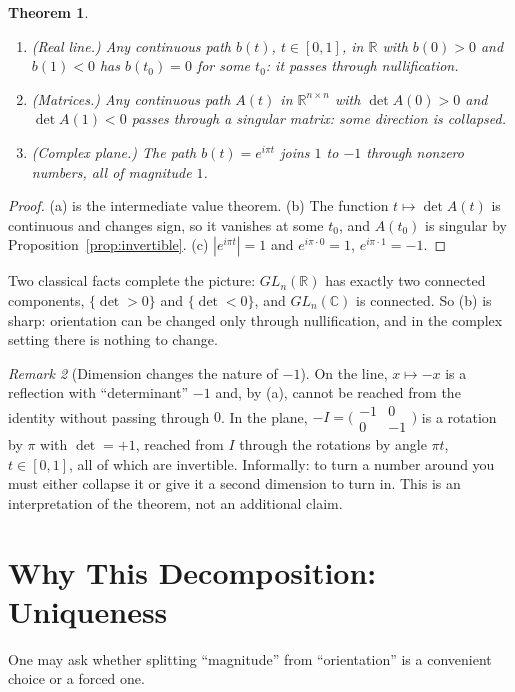 \documentclass[12pt]{article}
\newtheorem{theorem}{Theorem}
\theoremstyle{definition}
\theoremstyle{remark}
\newtheorem{remark}[theorem]{Remark}
\newcommand{\R}{\mathbb{R}}
\newcommand{\C}{\mathbb{C}}
\begin{document}
\begin{theorem}\label{thm:orientation}
\begin{enumerate}
\item[\textup{(a)}] \emph{(Real line.)} Any continuous path $b(t)$, $t\in[0,1]$, in $\R$ with $b(0)>0$ and $b(1)<0$ has $b(t_0)=0$ for some $t_0$: it passes through nullification.
\item[\textup{(b)}] \emph{(Matrices.)} Any continuous path $A(t)$ in $\R^{n\times n}$ with $\det A(0)>0$ and $\det A(1)<0$ passes through a singular matrix: some direction is collapsed.
\item[\textup{(c)}] \emph{(Complex plane.)} The path $b(t)=e^{i\pi t}$ joins $1$ to $-1$ through nonzero numbers, all of magnitude $1$.
\end{enumerate}
\end{theorem}
\begin{proof}
(a) is the intermediate value theorem. (b) The function $t\mapsto\det A(t)$ is continuous and changes sign, so it vanishes at some $t_0$, and $A(t_0)$ is singular by Proposition~\ref{prop:invertible}. (c) $|e^{i\pi t}|=1$ and $e^{i\pi\cdot0}=1$, $e^{i\pi\cdot1}=-1$.
\end{proof}

\noindent Two classical facts \cite{hall2015} complete the picture: $GL_n(\R)$ has exactly two connected components, $\{\det>0\}$ and $\{\det<0\}$, and $GL_n(\C)$ is connected. So (b) is sharp: orientation can be changed only through nullification, and in the complex setting there is nothing to change.

\begin{remark}[Dimension changes the nature of $-1$]\label{rem:dimension}
On the line, $x\mapsto -x$ is a reflection with ``determinant'' $-1$ and, by (a), cannot be reached from the identity without passing through $0$. In the plane, $-I=\bigl(\begin{smallmatrix}-1&0\\0&-1\end{smallmatrix}\bigr)$ is a rotation by $\pi$ with $\det=+1$, reached from $I$ through the rotations by angle $\pi t$, $t\in[0,1]$, all of which are invertible. Informally: to turn a number around you must either collapse it or give it a second dimension to turn in. This is an interpretation of the theorem, not an additional claim.
\end{remark}

\section{Why This Decomposition: Uniqueness}\label{sec:unique}
One may ask whether splitting ``magnitude'' from ``orientation'' is a convenient choice or a forced one.
\end{document}
